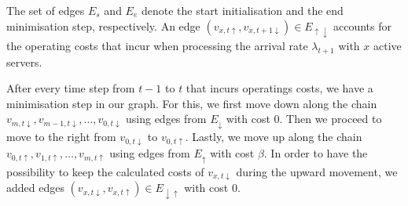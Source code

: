 \documentclass[hidelinks]{article}
\theoremstyle{plain}
\theoremstyle{definition}
\theoremstyle{rem}
\begin{document}
The set of edges $E_s$ and $E_e$ denote the start initialisation and the end minimisation step, respectively. An edge $(v_{x,t\uparrow},v_{x,t+1\downarrow})\in E_{\uparrow\downarrow}$ accounts for the operating costs that incur when processing the arrival rate $\lambda_{t+1}$ with $x$ active servers.

After every time step from $t-1$ to $t$ that incurs operatings costs, we have a minimisation step in our graph. For this, we first move down along the chain $v_{m,t\downarrow},v_{m-1,t\downarrow},\ldots,v_{0,t\downarrow}$ using edges from $E_\downarrow$ with cost $0$. Then we proceed to move to the right from $v_{0,t\downarrow}$ to $v_{0,t\uparrow}$. Lastly, we move up along the chain $v_{0,t\uparrow},v_{1,t\uparrow},\ldots,v_{m,t\uparrow}$ using edges from $E_\uparrow$ with cost $\beta$. In order to have the possibility to keep the calculated costs of $v_{x,t\downarrow}$ during the upward movement, we added edges $(v_{x,t\downarrow},v_{x,t\uparrow})\in E_{\downarrow\uparrow}$ with cost $0$.
\end{document}
